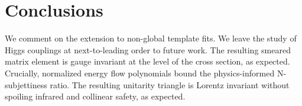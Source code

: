 \section{Conclusions}\label{sec:conclusions}

We comment on the extension to non-global template fits. We leave the
study of Higgs couplings at next-to-leading order to future work. The
resulting smeared matrix element is gauge invariant at the level of the
cross section, as expected. Crucially, normalized energy flow
polynomials bound the physics-informed N-subjettiness ratio. The
resulting unitarity triangle is Lorentz invariant without spoiling
infrared and collinear safety, as expected.

